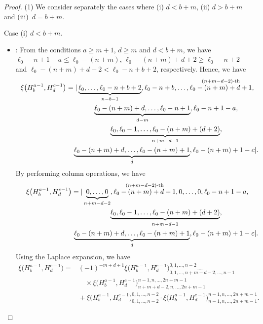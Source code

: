 \documentclass[pdftex]{sigma}
\numberwithin{equation}{section}
\begin{document}
\begin{proof} (1) We consider separately the cases where (i) $d<b+m$, (ii) $d>b+m$ and (iii)~${d=b\!+\!m}$.

Case (i) $d<b+m$.
\begin{itemize}
\item {}: From the conditions $a\geq m+1$, $d\geq m$ and $d<b+m$, we have $\ell_{0}-n+1-a\leq \ell_{0}-(n+m)$, $\ell_{0}-(n+m)+d+2\geq \ell_{0}-n+2$ and $\ell_{0}-(n+m)+d+2 <\ell_{0}-n+b+2$, respectively. Hence, we have
\begin{gather*}
\xi\bigl(H^{a-1}_{b}, H^{c-1}_{d}\bigr)=|\underbrace{\ell_{0},\dots,\ell_{0}-n+b+2}_{n-b-1},\ell_{0}-n+b,\dots, \stackrel{(n+m-d-2)\text{-th}}{\ell_{0}-(n+m)+d+1},\nonumber\\
\hphantom{\xi\bigl(H^{a-1}_{b}, H^{c-1}_{d}\bigr)=|}{}
\underbrace{\ell_{0}-(n+m)+d,\dots,\ell_0-n+1}_{d-m},\ell_{0}-n+1-a,\nonumber\\
\hphantom{\xi\bigl(H^{a-1}_{b}, H^{c-1}_{d}\bigr)=|}{}
\underbrace{\ell_{0},\ell_{0}-1,\dots,\ell_{0}-(n+m)+(d+2)}_{n+m-d-1},\nonumber\\
\hphantom{\xi\bigl(H^{a-1}_{b}, H^{c-1}_{d}\bigr)=|}{}
\underbrace{\ell_{0}-(n+m)+d,\dots,\ell_{0}-(n+m)+1}_{d},\ell_{0}-(n+m)+1-c|.
\end{gather*}
By performing column operations, we have
\begin{gather*}
\xi\bigl(H^{a-1}_{b}, H^{c-1}_{d}\bigr)=|\underbrace{0,\dots,0}_{n+m-d-2},\stackrel{(n+m-d-2)\text{-th}}{\ell_{0}-(n+m)+d+1},0, \dots,0,\ell_{0}-n+1-a,\nonumber\\
\hphantom{\xi\bigl(H^{a-1}_{b}, H^{c-1}_{d}\bigr)=|}{}
\underbrace{\ell_{0},\ell_{0}-1,\dots,\ell_{0}-(n+m)+(d+2)}_{n+m-d-1},\nonumber\\
\hphantom{\xi\bigl(H^{a-1}_{b}, H^{c-1}_{d}\bigr)=|}{}
\underbrace{\ell_{0}-(n+m)+d,\dots,\ell_{0}-(n+m)+1}_{d},\ell_{0}-(n+m)+1-c|.
\end{gather*}
Using the Laplace expansion, we have
\begin{align*}
\xi\bigl(H^{a-1}_{b}, H^{c-1}_{d}\bigr)={}&
{(-1)}^{-m+d+1}\xi\bigl(H^{a-1}_{b}, H^{c-1}_{d}\bigr)^{0,1,\dots,n-2}_{0,1,\dots,\widehat{n+m-d-2},\dots,n-1}\\
&\quad{}\times\xi\bigl(H^{a-1}_{b}, H^{c-1}_{d}\bigr)^{n-1,n,\dots,2n+m-1}_{n+m+d-2,n,\dots,2n+m-1}\\
&{}+\xi\bigl(H^{a-1}_{b}, H^{c-1}_{d}\bigr)^{0,1,\dots,n-2}_{0,1,\dots,n-2}\cdot\xi\bigl(H^{a-1}_{b}, H^{c-1}_{d}\bigr)^{n-1,n,\dots,2n+m-1}_{n-1,n,\dots,2n+m-1}.
\end{align*}



\end{itemize}
\end{proof}
\end{document}
